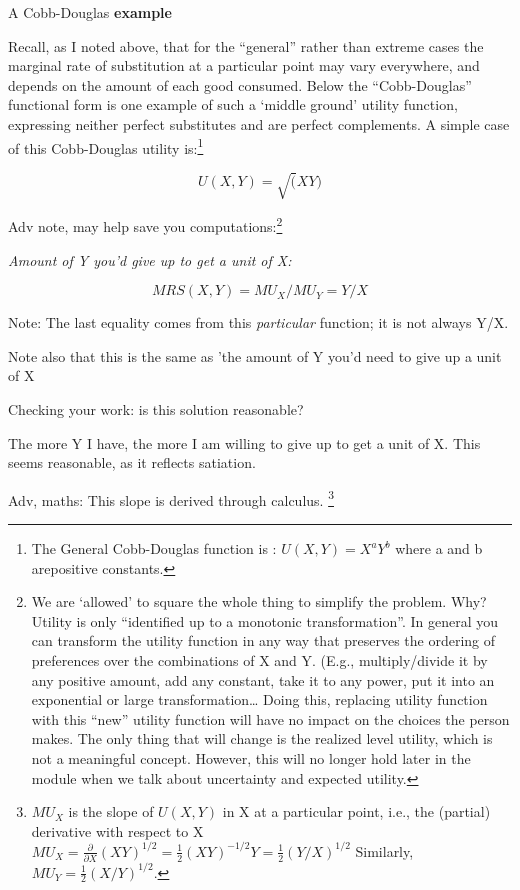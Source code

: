 \documentclass[]{article}
\begin{document}
A Cobb-Douglas \textbf{example}

Recall, as I noted above, that for the ``general'' rather than extreme
cases the marginal rate of substitution at a particular point may vary
everywhere, and depends on the amount of each good consumed. Below the
``Cobb-Douglas'' functional form is one example of such a `middle
ground' utility function, expressing neither perfect substitutes and are
perfect complements. A simple case of this Cobb-Douglas utility
is:\footnote{The General Cobb-Douglas function is : \(U(X,Y)=X^a Y^b\)
  where a and b arepositive constants.}

\[ U(X,Y)=\sqrt(XY) \]

\textcolor{RawSienna}{Adv note}, may help save you
computations:\footnote{We are `allowed' to square the whole thing to
  simplify the problem. Why? Utility is only ``identified up to a
  monotonic transformation''. In general you can transform the utility
  function in any way that preserves the ordering of preferences over
  the combinations of X and Y. (E.g., multiply/divide it by any positive
  amount, add any constant, take it to any power, put it into an
  exponential or large transformation\ldots{} Doing this, replacing
  utility function with this ``new'' utility function will have no
  impact on the choices the person makes. The only thing that will
  change is the realized level utility, which is not a meaningful
  concept. However, this will no longer hold later in the module when we
  talk about uncertainty and expected utility.}

\emph{Amount of Y you'd give up to get a unit of X:}

\[MRS(X,Y)= MU_X/MU_Y = Y/X\]

Note: The last equality comes from this \emph{particular} function; it
is not always Y/X.

Note also that this is the same as 'the amount of Y you'd need to give
up a unit of X

\bigskip

Checking your work: is this solution reasonable?

The more Y I have, the more I am willing to give up to get a unit of X.
This seems reasonable, as it reflects satiation.

\textcolor{RawSienna}{Adv, maths: This slope is derived through calculus. }\footnote{\(MU_X\)
  is the slope of \(U(X,Y)\) in X at a particular point, i.e., the
  (partial) derivative with respect to X
  \(MU_X = \frac{\partial}{\partial X} (XY)^{1/2} = \frac{1}{2} (XY)^{-1/2}Y = \frac{1}{2} (Y/X)^{1/2}\)
  Similarly, \(MU_Y = \frac{1}{2}(X/Y)^{1/2}\).}
\end{document}
